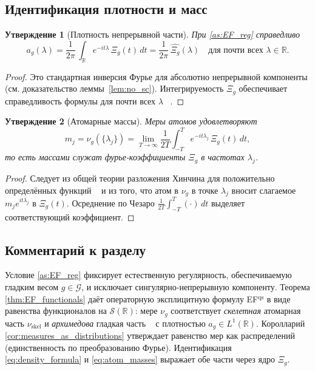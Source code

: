 \documentclass{article}
\numberwithin{equation}{section}
\theoremstyle{plain}
\newtheorem{proposition}{Утверждение}
\theoremstyle{definition}
\theoremstyle{remark}
\def\infty{∞}\def\partial{∂}\def\sum{Σ}\def\int{∫}%
\def\cdot{·}\def\times{×}\def\pm{±}\def\mp{∓}\def\approx{≈}%
\begin{document}
\subsection{Идентификация плотности и масс}
\label{subsec:identification}

\begin{proposition}[Плотность непрерывной части]
\label{prop:density}
При \ref{as:EF_reg} справедливо
\begin{equation}
\label{eq:density_formula}
a_g(\lambda)=\frac{1}{2\pi}\,\int_{\mathbb R} e^{-it\lambda}\,\Xi_g(t)\,dt
=\frac{1}{2\pi}\,\widehat{\Xi_g}(\lambda)
\quad \text{для почти всех }\lambda\in\mathbb R.
\end{equation}
\end{proposition}

\begin{proof}
Это стандартная инверсия Фурье для абсолютно непрерывной компоненты (см. доказательство леммы~\ref{lem:no_sc}).
Интегрируемость $\Xi_g$ обеспечивает справедливость формулы для почти всех $\lambda$ ~\cite{Wiener1933}.
\end{proof}

\begin{proposition}[Атомарные массы]
\label{prop:atoms}
Меры атомов удовлетворяют
\begin{equation}
\label{eq:atom_masses}
m_j=\nu_g(\{\lambda_j\})
=\lim_{T\to\infty}\frac{1}{2T}\int_{-T}^{T} e^{-it\lambda_j}\,\Xi_g(t)\,dt,
\end{equation}
то есть массами служат фурье-коэффициенты $\Xi_g$ в частотах $\lambda_j$.
\end{proposition}

\begin{proof}
Следует из общей теории разложения Хинчина для положительно определённых функций ~\cite{Khintchine1934} и из того,
что атом в $\nu_g$ в точке $\lambda_j$ вносит слагаемое $m_j e^{it\lambda_j}$ в $\Xi_g(t)$.
Осреднение по Чезаро $\frac{1}{2T}\int_{-T}^T(\cdot)\,dt$ выделяет соответствующий коэффициент.
\end{proof}

\subsection{Комментарий к разделу}
\label{subsec:summary6}

Условие \ref{as:EF_reg} фиксирует естественную регулярность, обеспечиваемую гладким весом $g\in\mathcal G$,
и исключает сингулярно-непрерывную компоненту. Теорема \ref{thm:EF_functionals} даёт
операторную эксплицитную формулу EF$^{\mathrm{qs}}$ в виде равенства функционалов на $\mathcal S(\mathbb R)$:
мере $\nu_g$ соответствует \emph{скелетная} атомарная часть $\nu_{\mathrm{skel}}$ и \emph{архимедова} гладкая часть ~\cite{Ivic1985}
с плотностью $a_g\in L^1(\mathbb R)$. Королларий \ref{cor:measures_as_distributions} утверждает
равенство мер как распределений (единственность по преобразованию Фурье).
Идентификация \eqref{eq:density_formula} и \eqref{eq:atom_masses} выражает обе части через ядро $\Xi_g$.
\end{document}
